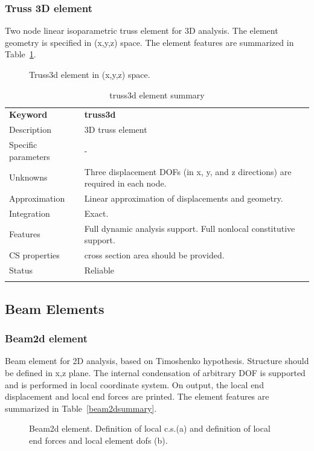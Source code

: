 \documentclass[a4paper]{article}
\newcommand{\templabel}{}%
\newcommand{\tempcaption}{}%
\newcounter{nelpar}
\newenvironment{elementsummary}[5]{%
  \gdef\tempcaption{#4}%
  \gdef\templabel{#5}%
  \setcounter{nelpar}{0}%
  \begin{center} %
    \begin{table}[!htb] %
      \begin{tabular}{|l|p{9cm}|}\hline %
        {\bf Keyword} & \bf{#1}\\ %
        {Description} & {#2}\\ %
        {Specific parameters} & {#3}\\ \hline %
}{
  \\ \hline %
      \end{tabular}%
      \caption{\tempcaption}%
      \label{\templabel}%
    \end{table}%
  \end{center}%
}
\newcommand{\elementDescription}[2]{{#1} & {#2}\\}
\begin{document}
\subsubsection{Truss 3D element}
\label{Truss3d}

Two node linear isoparametric truss element for 3D analysis. The
element geometry is specified in (x,y,z) space. The element features are summarized in Table~\ref{truss3dsummary}.

\begin{figure}[htb]
 \centering
 \begin{makeimage}
  
 \end{makeimage}
 \caption{Truss3d element in (x,y,z) space.}
\end{figure}


\begin{elementsummary}{truss3d}{3D truss element}{-}{truss3d element summary}{truss3dsummary}
\elementDescription{Unknowns}{Three displacement DOFs (in x, y, and z directions) are required
in each node.}
\elementDescription{Approximation}{Linear approximation of displacements and geometry.}
\elementDescription{Integration}{Exact.}
\elementDescription{Features}{Full dynamic analysis support. Full nonlocal
constitutive support.}
\elementDescription{CS properties}{cross section area should be
provided.}
\elementDescription{Status}{Reliable}
\end{elementsummary}



\clearpage
\subsection{Beam Elements}
\subsubsection{Beam2d element}
Beam element for 2D analysis, based on Timoshenko hypothesis. Structure should be defined in x,z
plane. The internal condensation
of arbitrary DOF is supported and is performed in local coordinate
system. On output, the local end displacement and local end forces are
printed. The element features are summarized in Table~\ref{beam2dsummary}.

\begin{figure}[htb]
 \centering
 \begin{makeimage}
   
 \end{makeimage}
 \caption{Beam2d element. Definition of local c.s.(a)  and definition of
 local end forces and local element dofs (b).}
 \label{beam2dfig}
\end{figure}
\end{document}
